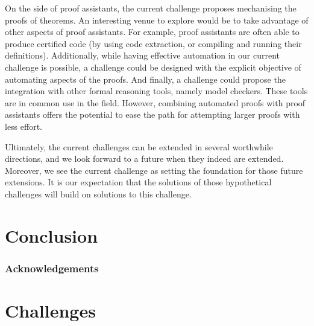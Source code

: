 \documentclass[runningheads]{llncs}
\begin{document}
On the side of proof assistants, the current challenge proposes
mechanising the proofs of theorems. An interesting venue to explore
would be to take advantage of other aspects of proof assistants. For
example, proof assistants are often able to produce certified code (by
using code extraction, or compiling and running their definitions).
Additionally, while having effective automation in our current
challenge is possible, a challenge could be designed with the explicit
objective of automating aspects of the proofs. And finally, a
challenge could propose the integration with other formal reasoning
tools, namely model checkers. These tools are in common use in the
field. However, combining automated proofs with proof assistants
offers the potential to ease the path for attempting larger proofs
with less effort.

Ultimately, the current challenges can be extended in several
worthwhile directions, and we look forward to a future when they
indeed are extended. Moreover, we see the current challenge as setting
the foundation for those future extensions. It is our expectation that
the solutions of those hypothetical challenges will build on solutions
to this challenge.

\section{Conclusion}\label{sec:conclusion}

\subsubsection*{Acknowledgements}

\appendix
\section{Challenges}\label{app:challenges}




\end{document}

